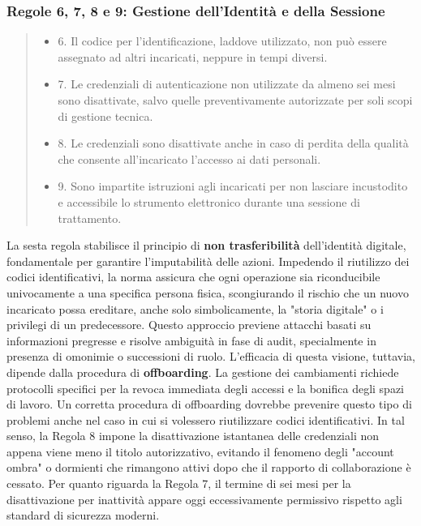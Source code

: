 \subsubsection*{Regole 6, 7, 8 e 9: Gestione dell'Identità e della Sessione}

\begin{quote}
    \begin{itemize}
        \item 6. Il codice per l'identificazione, laddove utilizzato, non può essere assegnato ad altri incaricati, neppure in tempi diversi.
        \item 7. Le credenziali di autenticazione non utilizzate da almeno sei mesi sono disattivate, salvo quelle preventivamente autorizzate per soli scopi di gestione tecnica.
        \item 8. Le credenziali sono disattivate anche in caso di perdita della qualità che consente all'incaricato l'accesso ai dati personali.
        \item 9. Sono impartite istruzioni agli incaricati per non lasciare incustodito e accessibile lo strumento elettronico durante una sessione di trattamento.
    \end{itemize}
\end{quote}
La sesta regola stabilisce il principio di \textbf{non trasferibilità} dell'identità digitale, fondamentale per garantire l'imputabilità delle azioni.
Impedendo il riutilizzo dei codici identificativi, la norma assicura che ogni operazione sia riconducibile univocamente a una specifica persona fisica, scongiurando il rischio che un nuovo incaricato possa ereditare, anche solo simbolicamente, la "storia digitale" o i privilegi di un predecessore.
Questo approccio previene attacchi basati su informazioni pregresse e risolve ambiguità in fase di audit, specialmente in presenza di omonimie o successioni di ruolo.
L'efficacia di questa visione, tuttavia, dipende dalla procedura di \textbf{offboarding}.
La gestione dei cambiamenti richiede protocolli specifici per la revoca immediata degli accessi e la bonifica degli spazi di lavoro.
Un corretta procedura di offboarding dovrebbe prevenire questo tipo di problemi anche nel caso in cui si volessero riutilizzare codici identificativi.
In tal senso, la Regola 8 impone la disattivazione istantanea delle credenziali non appena viene meno il titolo autorizzativo, evitando il fenomeno degli "account ombra" o dormienti che rimangono attivi dopo che il rapporto di collaborazione è cessato.
Per quanto riguarda la Regola 7, il termine di sei mesi per la disattivazione per inattività appare oggi eccessivamente permissivo rispetto agli standard di sicurezza moderni.
